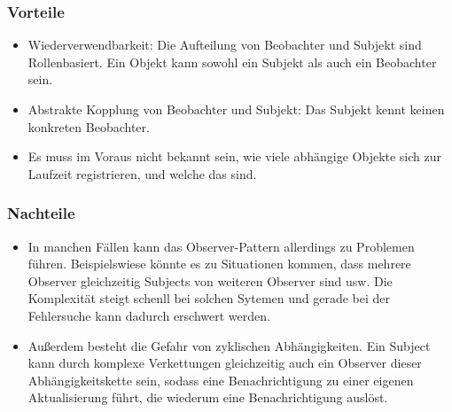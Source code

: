 \subsubsection{Vorteile}
\begin{itemize}
\item Wiederverwendbarkeit: Die Aufteilung von Beobachter und Subjekt sind Rollenbasiert. Ein Objekt kann sowohl ein Subjekt als auch ein Beobachter sein.
\item Abstrakte Kopplung von Beobachter und Subjekt: Das Subjekt kennt keinen konkreten Beobachter.  
\item Es muss im Voraus nicht bekannt sein, wie viele abhängige Objekte sich zur Laufzeit registrieren, und welche das sind.
\end{itemize}
\subsubsection{Nachteile}
\begin{itemize}
\item In manchen Fällen kann das Observer-Pattern allerdings zu Problemen führen. Beispielswiese könnte es zu Situationen kommen, dass mehrere Observer gleichzeitig Subjects von weiteren Observer sind usw. Die Komplexität steigt schenll bei solchen Sytemen und gerade bei der Fehlersuche kann dadurch erschwert werden.
\item Außerdem besteht die Gefahr von zyklischen Abhängigkeiten. Ein Subject kann durch komplexe Verkettungen gleichzeitig auch ein Observer dieser Abhängigkeitskette sein, sodass eine Benachrichtigung zu einer eigenen Aktualisierung führt, die wiederum  eine Benachrichtigung auslöst.
\end{itemize}
